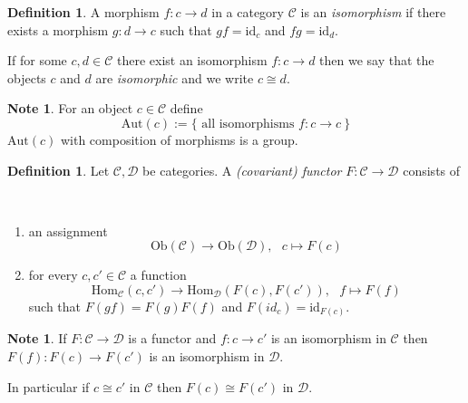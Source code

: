 \documentclass[12pt, letterpaper, oneside]{article}
\theoremstyle{plain}
\theoremstyle{definition}
\newtheorem{definition}[theorem]{Definition}
\newtheorem{note}[theorem]{Note}
\newcommand{\Hom}{\mathrm{Hom}}
\newcommand{\Aut}{\mathrm{Aut}}
\newcommand{\Ob}{\mathrm{Ob}}
\newcommand{\id}{\mathrm{id}}
\newcommand{\CC}{{\mathcal C}}
\newcommand{\DD}{{\mathcal D}}
\newcommand{\benu}{\begin{enumerate}}
\newcommand{\eenu}{\end{enumerate}}
\newcommand{\vs}{\vskip 5mm}
\begin{document}
\vs\vs

\begin{definition}
A morphism $f\colon c\to d$ in a category $\CC$ is an \emph{isomorphism} if there exists
a morphism $g\colon d\to c$ such that $gf = \id_{c}$ and $fg= \id_{d}$.\

If for some $c, d \in \CC$ there exist an isomorphism $f\colon c\to d$ then we say that 
the objects $c$ and $d$ are \emph{isomorphic} and we write $c\cong d$.
\end{definition}

\vs\vs

\begin{note}
For an object $c\in \CC$ define 
$$\Aut(c) := \{ \text{ all isomorphisms } f\colon c\to c\  \} $$
$\Aut(c)$ with composition of morphisms is a group.  
\end{note}


\begin{definition}
Let $\CC, \DD$ be categories. A \emph{(covariant) functor} $F\colon \CC \to \DD$ consists of

\vskip -13mm

\ 
\benu
\item an assignment 
$$\Ob(\CC) \to \Ob(\DD), \ \ \ c\mapsto F(c)$$
\item for every $c, c'\in \CC$ a function
$$\Hom_{\CC}(c, c') \to \Hom_{\DD}(F(c), F(c')), \ \ \  f \mapsto F(f)$$
such that $F(gf) = F(g)F(f)$ and $F(id_{c}) = \id_{F(c)}$.
\eenu

\end{definition}

\vs\vs

\begin{note}
If $F\colon \CC \to \DD$ is a functor and $f\colon c\to c'$ is an isomorphism in $\CC$
then $F(f)\colon F(c)\to F(c')$ is an isomorphism in $\DD$.

In particular if $c\cong c'$ in $\CC$ then $F(c)\cong F(c')$ in $\DD$.
\end{note}


\vs\vs
\end{document}
